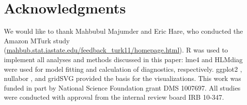 \documentclass[12pt]{article} %
\newcommand{\hh}[1]{{\color{orange} #1}}
\newcommand{\alnote}[1]{\todo[inline,color=green!40]{#1}} %
\begin{document}


\section{Acknowledgments}
We would like to thank Mahbubul Majumder and Eric Hare, who conducted the Amazon MTurk study (\url{mahbub.stat.iastate.edu/feedback_turk11/homepage.html}). R \citep{R} was used to implement all analyses and methods discussed in this paper: lme4 \citep{lme4} and HLMdiag \citep{HLMDiag, Loy:JSS} were used for model fitting and  calculation of diagnostics, respectively.  ggplot2 \citep{ggplot2}, nullabor \citep{nullabor}, and gridSVG \citep{gridSVG} provided the basis for the visualizations.
This work was funded in part by National Science Foundation grant DMS 1007697. All studies were conducted with approval from the internal review board IRB 10-347.

%
%





\clearpage
\appendix
\end{document}

